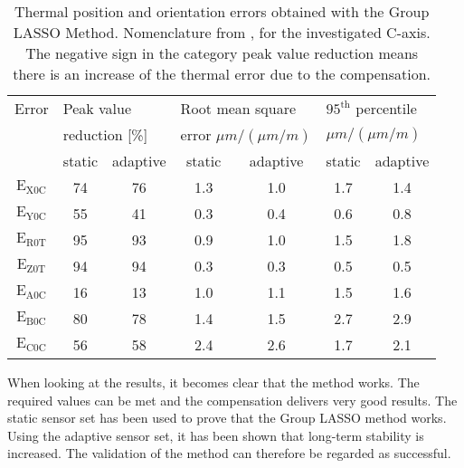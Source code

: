 \begin{table}[!htb]
\centering
\begin{threeparttable}
\caption[Statistical evaluation of the data and comparison of the methods - static vs. adaptive]{Thermal position and orientation errors obtained with the Group LASSO Method.  Nomenclature from \cite{Blaser_2017}, for the investigated C-axis. The negative sign in the category peak value reduction means there is an increase of the thermal error due to the compensation.}
\begin{tabular}{c c c c c c c}
\hline
Error  & \multicolumn{2}{l}{Peak value} \hspace{2cm} & \multicolumn{2}{l}{Root mean square} \hspace{2cm} & \multicolumn{2}{l}{$\mathrm{95^{th}}$ percentile} \vspace{-0.2cm} \\
 & \multicolumn{2}{l}{reduction [\%]} & \multicolumn{2}{l}{error $\mu m / (\mu m / m)$} & \multicolumn{2}{l}{$\mu m / (\mu m / m)$} \\
\hline
  & static & adaptive & static & adaptive & static & adaptive \\
  \hline \vspace{-0.2cm}
 $\mathrm{E_{X0C}}$ & 74 & 76 & 1.3 & 1.0 & 1.7 & 1.4 \\ \vspace{-0.2cm}
 $\mathrm{E_{Y0C}}$ & 55 & 41 & 0.3 & 0.4 & 0.6 & 0.8 \\ \vspace{-0.2cm}
 $\mathrm{E_{R0T}}$ & 95 & 93 & 0.9 & 1.0 & 1.5 & 1.8 \\ \vspace{-0.2cm}
 $\mathrm{E_{Z0T}}$ & 94 & 94 & 0.3 & 0.3 & 0.5 &  0.5\\ \vspace{-0.2cm}
 $\mathrm{E_{A0C}}$ & 16 & 13 & 1.0 & 1.1 & 1.5 & 1.6 \\ \vspace{-0.2cm}
 $\mathrm{E_{B0C}}$ & 80 & 78 & 1.4 & 1.5 & 2.7 & 2.9 \\ 
 $\mathrm{E_{C0C}}$ & 56 & 58 & 2.4 & 2.6 & 1.7 & 2.1 \\
\hline
\end{tabular}
\label{Tab:statistic_GL}
\end{threeparttable}
\end{table}

When looking at the results, it becomes clear that the method works. The required values can be met and the compensation delivers very good results. The static sensor set has been used to prove that the Group LASSO method works. Using the adaptive sensor set, it has been shown that long-term stability is increased. The validation of the method can therefore be regarded as successful.


